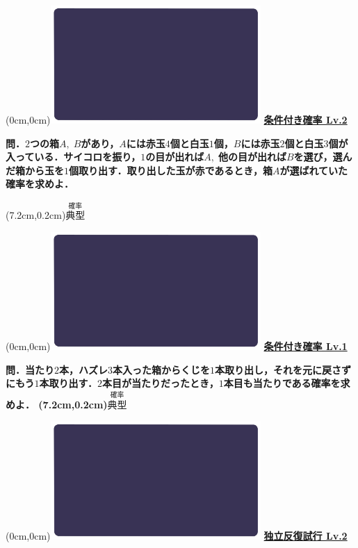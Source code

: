 \documentclass[10pt,
fleqn,
dvipdfmx,
uplatex
]{jsarticle}
\begin{document}
\newpage



\at(0cm,0cm){\includegraphics[width=8cm,bb=0 0 1920 1080]{./youtube/thumbnails/templates/smart_background/確率.jpeg}}
{\color{orange}\bf\boldmath\huge\underline{条件付き確率 Lv.2 }}\vspace{0.3zw}

\normalsize 
\bf\boldmath 問．$2$つの箱$A,\;B$があり，$A$には赤玉$4$個と白玉$1$個，$B$には赤玉$2$個と白玉$3$個が入っている．サイコロを振り，$1$の目が出れば$A,\;$他の目が出れば$B$を選び，選んだ箱から玉を$1$個取り出す．取り出した玉が赤であるとき，箱$A$が選ばれていた確率を求めよ．

\at(7.2cm,0.2cm){\small\color{bradorange}$\overset{\text{確率}}{\text{典型}}$}


\newpage



\at(0cm,0cm){\includegraphics[width=8cm,bb=0 0 1920 1080]{./youtube/thumbnails/templates/smart_background/確率.jpeg}}
{\color{orange}\bf\boldmath\LARGE\underline{条件付き確率 Lv.1 }}\vspace{0.3zw}

\Large 
\bf\boldmath 問．当たり$2$本，ハズレ$3$本入った箱からくじを$1$本取り出し，それを元に戻さずにもう$1$本取り出す．$2$本目が当たりだったとき，$1$本目も当たりである確率を求めよ．
\at(7.2cm,0.2cm){\small\color{bradorange}$\overset{\text{確率}}{\text{典型}}$}


\newpage



\at(0cm,0cm){\includegraphics[width=8cm,bb=0 0 1920 1080]{./youtube/thumbnails/templates/smart_background/確率.jpeg}}
{\color{orange}\bf\boldmath\huge\underline{独立反復試行 Lv.2 }}\vspace{0.3zw}
\end{document}
